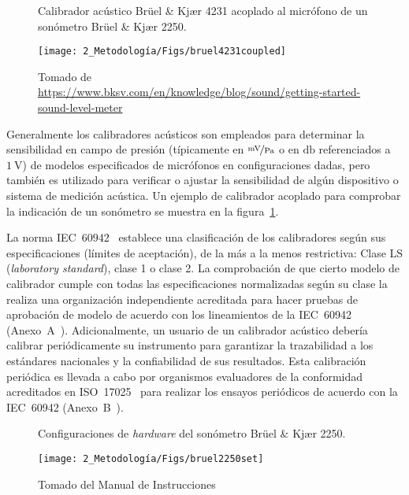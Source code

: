 \begin{figure}[!h]
    \caption{Calibrador acústico Brüel \& Kjær 4231 acoplado al micrófono de un sonómetro Brüel \& Kjær 2250.}
    \label{fig:bruel_4231_coupled}
    \centering
    \texttt{[image: 2\_Metodología/Figs/bruel4231coupled]}
    \caption*{\footnotesize Tomado de \scriptsize \url{https://www.bksv.com/en/knowledge/blog/sound/getting-started-sound-level-meter}}
\end{figure}
%
Generalmente los calibradores acústicos son empleados para determinar la sensibilidad en campo de presión (típicamente en $\nicefrac{\unit{\mV}}{\unit{\Pa}}$ o en $\unit{\decibel}$ referenciados a $\qty{1}{\V}$) de modelos especificados de micrófonos en configuraciones dadas, pero también es utilizado para verificar o ajustar la sensibilidad de algún dispositivo o sistema de medición acústica.
Un ejemplo de calibrador acoplado para comprobar la indicación de un sonómetro se muestra en la figura~\ref{fig:bruel_4231_coupled}.

La norma \mbox{IEC 60942}~\citeyearpar{IEC_TC29_2017} establece una clasificación de los calibradores según sus especificaciones (límites de aceptación), de la más a la menos restrictiva: Clase LS (\emph{laboratory standard}), clase 1 o clase 2.
La comprobación de que cierto modelo de calibrador cumple con todas las especificaciones normalizadas según su clase la realiza una organización independiente acreditada para hacer pruebas de aprobación de modelo de acuerdo con los lineamientos de la \mbox{IEC 60942} (\mbox{Anexo A}~\citeyear{IEC_TC29_2017}).
Adicionalmente, un usuario de un calibrador acústico debería calibrar periódicamente su instrumento para garantizar la trazabilidad a los estándares nacionales y la confiabilidad de sus resultados.
Esta calibración periódica es llevada a cabo por organismos evaluadores de la conformidad acreditados en \mbox{ISO 17025}~\citeyearpar{ISO_CASCO_2017} para realizar los ensayos periódicos de acuerdo con la \mbox{IEC 60942} (\mbox{Anexo B}~\citeyear{IEC_TC29_2017}).
\vfill

\begin{figure}[!hp]
    \caption{Configuraciones de \emph{hardware} del sonómetro Brüel \& Kjær 2250.}
    \label{fig:bruel_2250_set}
    \centering
    \texttt{[image: 2\_Metodología/Figs/bruel2250set]}
    \caption*{\footnotesize Tomado del Manual de Instrucciones }
\end{figure}

